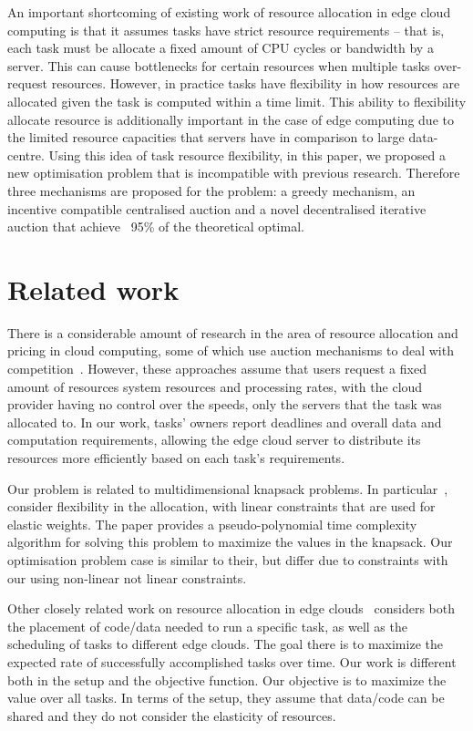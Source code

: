 An important shortcoming of existing work of resource allocation in edge cloud computing is that it assumes tasks have
strict resource requirements -- that is, each task must be allocate a fixed amount of CPU cycles or bandwidth by a
server. This can cause bottlenecks for certain resources when multiple tasks over-request resources. However, in
practice tasks have flexibility in how resources are allocated given the task is computed within a time limit. This
ability to flexibility allocate resource is additionally important in the case of edge computing due to the limited
resource capacities that servers have in comparison to large data-centre. Using this idea of task resource flexibility,
in this paper, we proposed a new optimisation problem that is incompatible with previous research. Therefore three
mechanisms are proposed for the problem: a greedy mechanism, an incentive compatible centralised auction and a novel
decentralised iterative auction that achieve ~95\% of the theoretical optimal.


\section{Related work}\label{sec:related-work}
There is a considerable amount of research in the area of resource allocation and pricing in cloud computing, some of
which use auction mechanisms to deal with competition~\cite{KUMAR2017234,Zhang2017,Du2019,Bi2019}.
However, these approaches assume that users request a fixed amount of resources system resources and processing rates,
with the cloud provider having no control over the speeds, only the servers that the task was allocated to. In our
work, tasks' owners report deadlines and overall data and computation requirements, allowing the edge cloud server to
distribute its resources more efficiently based on each task's requirements.

Our problem is related to multidimensional knapsack problems. In particular~\cite{Nip2017}, consider flexibility in
the allocation, with linear constraints that are used for elastic weights. The paper provides a pseudo-polynomial time
complexity algorithm for solving this problem to maximize the values in the knapsack. Our optimisation problem case is
similar to their, but differ due to constraints with our using non-linear not linear constraints.

Other closely related work on resource allocation in edge clouds~\cite{vaji_infocom} considers both the placement of
code/data needed to run a specific task, as well as the scheduling of tasks to different edge clouds. The goal there is
to maximize the expected rate of successfully accomplished tasks over time. Our work is different both in the setup and
the objective function. Our objective is to maximize the value over all tasks. In terms of the setup, they assume that
data/code can be shared and they do not consider the elasticity of resources.